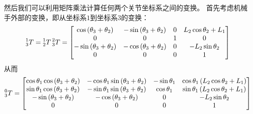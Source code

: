 \documentclass{ctexart}
\begin{document}
然后我们可以利用矩阵乘法计算任何两个关节坐标系之间的变换。
首先考虑机械手外部的变换，即从坐标系$1$到坐标系$3$的变换：
\[
    \prescript{1}{3}{T} = \prescript{1}{2}{T} \prescript{2}{3}{T} =
    \begin{bmatrix}
        \cos{\left( {{\theta }_3}+{{\theta }_2}\right) } & -\sin{\left( {{\theta }_3}+{{\theta }_2}\right) } & 0 & {L_2} \cos{ {{\theta }_2} }+{L_1}\\
        0 & 0 & 1 & 0\\
        -\sin{\left( {{\theta }_3}+{{\theta }_2}\right) } & -\cos{\left( {{\theta }_3}+{{\theta }_2}\right) } & 0 & - {L_2} \sin{ {{\theta }_2} } \\
        0 & 0 & 0 & 1
    \end{bmatrix}
\]
从而
\[
    \prescript{0}{3}{T} =
    \begin{bmatrix}
        \cos \theta_1 \cos{\left( {{\theta }_3}+{{\theta }_2}\right) } & - \cos \theta_1 \sin{\left( {{\theta }_3}+{{\theta }_2}\right) }  & -\sin \theta_1 & \cos \theta_1 \left( {L_2} \cos\theta_2+{L_1}\right) \\
            \sin \theta_1 \cos{\left( {{\theta }_3}+{{\theta }_2}\right) } & - \sin \theta_1 \sin{\left( {{\theta }_3}+{{\theta }_2}\right) }  & \cos \theta_1 & \sin \theta_1 \left( {L_2} \cos\theta_2+{L_1}\right) \\
            -\sin{\left( {{\theta }_3}+{{\theta }_2}\right) } & -\cos{\left( {{\theta }_3}+{{\theta }_2}\right) } & 0 & - {L_2} \sin \theta_2 \\
            0 & 0 & 0 & 1
    \end{bmatrix}
\]
\end{document}
